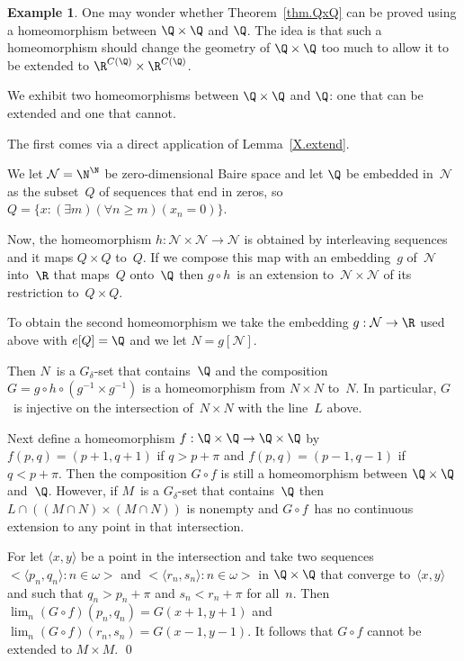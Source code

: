 \documentclass[a4paper]{amsart}
\newcommand\calN{\mathcal{N}}
\newcommand\orpr[2]{\langle{#1},{#2}\rangle}
\theoremstyle{plain}
\theoremstyle{definition}
\newtheorem{example}[theorem]{Example}
\theoremstyle{remark}
\begin{document}
\begin{example}
One may wonder whether Theorem~\ref{thm.QxQ} can be proved using a 
homeomorphism between $\Q\times\Q$ and $\Q$.
The idea is that such a homeomorphism should change the geometry of
$\Q\times \Q$ too much to allow it to be extended to $\R^{C(\Q)}\times\R^{C(\Q)}$.

\medskip
We exhibit two homeomorphisms between $\Q\times\Q$ and $\Q$: one that can be 
extended and one that cannot.

\smallskip
The first comes via a direct application of Lemma~\ref{X.extend}.

We let $\calN=\N^\N$ be zero-dimensional Baire space and let $\Q$ be embedded 
in~$\calN$ as the subset~$Q$ of sequences that end in zeros,
so $Q=\{x:(\exists m)(\forall n\ge m)(x_n=0)\}$.

Now, the homeomorphism $h:\calN\times\calN\to\calN$ is obtained by interleaving
sequences and it maps $Q\times Q$ to~$Q$.
If we compose this map with an embedding~$g$ of~$\calN$ into~$\R$ that maps~$Q$
onto~$\Q$ then $g\circ h$~is an extension to~$\calN\times\calN$
of its restriction to~$Q\times Q$.

\smallskip
To obtain the second homeomorphism we take the embedding $g:\calN\to\R$
used above with $e[Q]=\Q$ and we let $N=g[\calN]$.

Then $N$~is a $G_\delta$-set that contains~$\Q$ and the composition
$G=g\circ h\circ(g^{-1}\times g^{-1})$ is a homeomorphism from $N\times N$ 
to~$N$.
In particular, $G$~is injective on the intersection of~$N\times N$
with the line~$L$ above.

Next define a homeomorphism $f:\Q\times\Q\to\Q\times\Q$ 
by $f(p,q)=(p+1,q+1)$ if $q>p+\pi$ and $f(p,q)=(p-1,q-1)$ if $q<p+\pi$.
Then the composition $G\circ f$ is still a homeomorphism between $\Q\times\Q$
and~$\Q$.
However, if $M$~is a $G_\delta$-set that contains~$\Q$ then 
$L\cap((M\cap N)\times(M\cap N))$ is nonempty and
$G\circ f$~has no continuous extension to any point in that intersection.

For let $\orpr xy$ be a point in the intersection and take two sequences 
$\bigl<\orpr{p_n}{q_n}:n\in\omega\bigr>$ and
$\bigl<\orpr{r_n}{s_n}:n\in\omega\bigr>$ in $\Q\times\Q$ that converge 
to~$\orpr xy$ and such that $q_n>p_n+\pi$ and $s_n<r_n+\pi$ for all~$n$.
Then $\lim_n(G\circ f)(p_n,q_n)=G(x+1,y+1)$
and $\lim_n(G\circ f)(r_n,s_n)=G(x-1,y-1)$.
It follows that $G\circ f$ cannot be extended to $M\times M$. \qed
\end{example}
\end{document}
